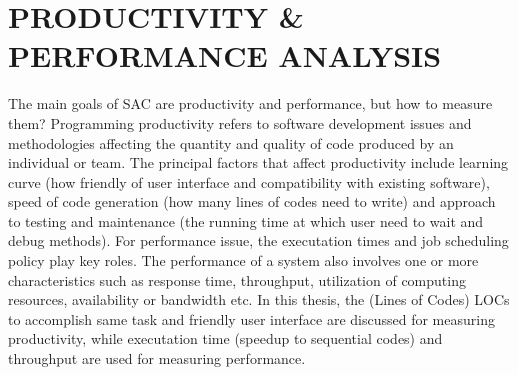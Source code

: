 %
%
%


\chapter{\uppercase {Productivity \& Performance Analysis}}
The main goals of SAC are productivity and performance, but how to measure them? Programming productivity \cite{ProgramProductWiki} refers to software development issues and methodologies affecting the quantity and quality of code produced by an individual or team. The principal factors that affect productivity include learning curve (how friendly of user interface and compatibility with existing software), speed of code generation (how many lines of codes need to write) and approach to testing and maintenance (the running time at which user need to wait and debug methods). For performance issue, the executation times and job scheduling policy play key roles. The performance of a system also involves one or more characteristics such as response time, throughput, utilization of computing resources, availability or bandwidth etc. In this thesis, the (Lines of Codes) LOCs to accomplish same task and friendly user interface are discussed for measuring productivity, while executation time (speedup to sequential codes) and throughput are used for measuring performance.  

